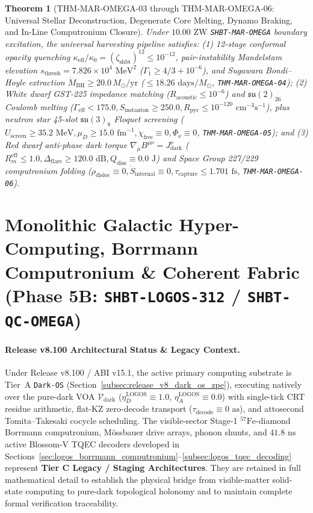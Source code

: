 \documentclass[11pt,onecolumn]{article}
\newtheorem{theorem}{Theorem}
\begin{document}
\begin{theorem}[THM-MAR-OMEGA-03 through THM-MAR-OMEGA-06: Universal Stellar Deconstruction, Degenerate Core Melting, Dynamo Braking, and In-Line Computronium Closure]
\label{thm:mar_omega_03_06}
Under $10.00\text{ ZW}$ \texttt{SHBT-MAR-OMEGA} boundary excitation, the universal harvesting pipeline satisfies: (1) 12-stage conformal opacity quenching $\kappa_{\text{eff}}/\kappa_0 = (\zeta_{\text{shbt}})^{12} \le 10^{-12}$, pair-instability Mandelstam elevation $s_{\text{thresh}} = 7.826 \times 10^4\text{ MeV}^2$ ($\Gamma_1 \ge 4/3 + 10^{-6}$), and Sugawara Bondi--Hoyle extraction $\dot{M}_{\text{BH}} \ge 20.0\,M_\odot/\text{yr}$ ($\le 18.26\text{ days}/M_\odot$, \texttt{THM-MAR-OMEGA-04}); (2) White dwarf GST-225 impedance matching ($R_{\text{acoustic}} \le 10^{-6}$) and $\mathfrak{su}(2)_{26}$ Coulomb melting ($\Gamma_{\text{eff}} < 175.0, S_{\text{instanton}} \ge 250.0, R_{\text{pyc}} \le 10^{-120}\text{ cm}^{-3}\text{s}^{-1}$), plus neutron star 45-slot $\mathfrak{su}(3)_8$ Floquet screening ($U_{\text{screen}} \ge 35.2\text{ MeV}, \mu_D \ge 15.0\text{ fm}^{-1}, \chi_{\text{free}} \equiv 0, \Phi_\nu \equiv 0$, \texttt{THM-MAR-OMEGA-05}); and (3) Red dwarf anti-phase dark torque $\nabla_\mu B^{\mu\nu} = J_{\text{dark}}^\nu$ ($R_m^{\text{eff}} \le 1.0, \Delta_{\text{flare}} \ge 120.0\text{ dB}, Q_{\text{diss}} \equiv 0.0\text{ J}$) and Space Group 227/229 computronium folding ($\rho_{\text{disloc}} \equiv 0, \dot{S}_{\text{internal}} \equiv 0, \tau_{\text{capture}} \le 1.701\text{ fs}$, \texttt{THM-MAR-OMEGA-06}).
\end{theorem}
\FloatBarrier

\section{Monolithic Galactic Hyper-Computing, Borrmann Computronium \& Coherent Fabric (Phase 5B: \texttt{SHBT-LOGOS-312} / \texttt{SHBT-QC-OMEGA})}
\paragraph{Release v8.100 Architectural Status \& Legacy Context.}
Under Release v8.100 / ABI v15.1, the active primary computing substrate is Tier~A \texttt{Dark-OS} (Section~\ref{subsec:release_v8_dark_os_zpe}), executing natively over the pure-dark VOA $\mathcal{V}_{\text{dark}}$ ($\eta_D^{\text{LOGOS}}\equiv1.0$, $\eta_A^{\text{LOGOS}}\equiv0.0$) with single-tick CRT residue arithmetic, flat-KZ zero-decode transport ($\tau_{\text{decode}}\equiv0\text{ as}$), and attosecond Tomita--Takesaki cocycle scheduling. The visible-sector Stage-1 $^{57}\text{Fe}$-diamond Borrmann computronium, M\"ossbauer drive arrays, phonon shunts, and $41.8\text{ ns}$ active Blossom-V TQEC decoders developed in Sections~\ref{sec:logos_borrmann_computronium}--\ref{subsec:logos_tqec_decoding} represent \textbf{Tier C Legacy / Staging Architectures}. They are retained in full mathematical detail to establish the physical bridge from visible-matter solid-state computing to pure-dark topological holonomy and to maintain complete formal verification traceability.
\end{document}
